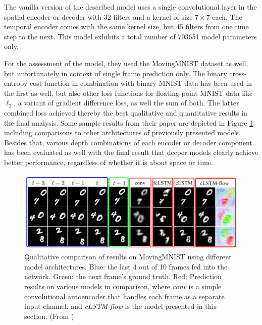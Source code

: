The vanilla version of the described model uses a single convolutional layer in the spatial encoder or decoder with \num{32} filters and a kernel of size $7 \times 7$ each. The temporal encoder comes with the same kernel size, but \num{45} filters from one time step to the next. This model exhibits a total number of \num{703651} model parameters only. 

For the assessment of the model, they used the MovingMNIST dataset as well, but unfortunately in context of single frame prediction only. The binary cross-entropy cost function in combination with binary MNIST data has been used in the first as well, but also other loss functions for floating-point MNIST data like $\ell_2$, a variant of gradient difference loss, as well the sum of both. The latter combined loss achieved thereby the best qualitative and quantitative results in the final analysis. Some sample results from their paper are depicted in Figure \ref{fig:spatiotemp_results}, including comparisons to other architectures of previously presented models. Besides that, various depth combinations of each encoder or decoder component has been evaluated as well with the final result that deeper models clearly achieve better performance, regardless of whether it is about space or time.

\begin{figure}[htb]
	\centering
	\includegraphics[width=1.0\linewidth]{figures/related/spat_temp_results.png} 
	\caption[Qualitative MovingMNIST Results of LSTM Models]{Qualitative comparison of results on MovingMNIST using different model architectures. Blue: the last 4 out of 10 frames fed into the network. Green: the next frame's ground truth. Red: Prediction results on various models in comparison, where \textit{conv} is a simple convolutional autoencoder that handles each frame as a separate input channel, and \textit{cLSTM-flow} is the model presented in this section. (From \parencite{spat_temp_video_autoenc})} \label{fig:spatiotemp_results}
\end{figure}

